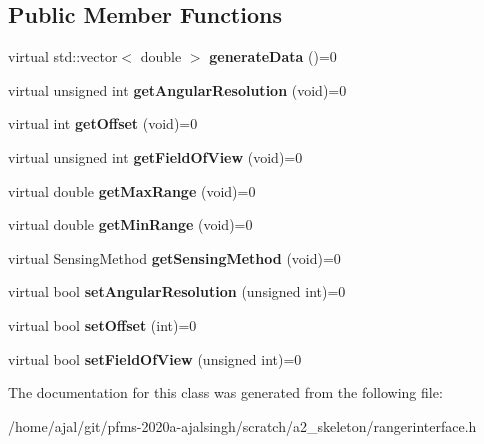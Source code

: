 \subsection*{Public Member Functions}
\begin{DoxyCompactItemize}
\item 
virtual std\+::vector$<$ double $>$ {\bfseries generate\+Data} ()=0\hypertarget{classRangerInterface_a969c670cadf55a15733809116dc305c8}{}\label{classRangerInterface_a969c670cadf55a15733809116dc305c8}

\item 
virtual unsigned int {\bfseries get\+Angular\+Resolution} (void)=0\hypertarget{classRangerInterface_a37d4f89daffa8b2708dfc11034893552}{}\label{classRangerInterface_a37d4f89daffa8b2708dfc11034893552}

\item 
virtual int {\bfseries get\+Offset} (void)=0\hypertarget{classRangerInterface_a8d77cf9d9b95fe8fb315931f2f278fec}{}\label{classRangerInterface_a8d77cf9d9b95fe8fb315931f2f278fec}

\item 
virtual unsigned int {\bfseries get\+Field\+Of\+View} (void)=0\hypertarget{classRangerInterface_a18716da6932402b8dda75f682be6f06c}{}\label{classRangerInterface_a18716da6932402b8dda75f682be6f06c}

\item 
virtual double {\bfseries get\+Max\+Range} (void)=0\hypertarget{classRangerInterface_a0bb29a41de5767c99081002c0590c186}{}\label{classRangerInterface_a0bb29a41de5767c99081002c0590c186}

\item 
virtual double {\bfseries get\+Min\+Range} (void)=0\hypertarget{classRangerInterface_ae6d501ddeeaad4a7b44d7d51ce64cb88}{}\label{classRangerInterface_ae6d501ddeeaad4a7b44d7d51ce64cb88}

\item 
virtual Sensing\+Method {\bfseries get\+Sensing\+Method} (void)=0\hypertarget{classRangerInterface_a6fdc6a8e9b3a4ebf0b1f5be3c607ef7d}{}\label{classRangerInterface_a6fdc6a8e9b3a4ebf0b1f5be3c607ef7d}

\item 
virtual bool {\bfseries set\+Angular\+Resolution} (unsigned int)=0\hypertarget{classRangerInterface_a313296ae5d13c6acce69caaf646ea66e}{}\label{classRangerInterface_a313296ae5d13c6acce69caaf646ea66e}

\item 
virtual bool {\bfseries set\+Offset} (int)=0\hypertarget{classRangerInterface_ae72584d83c94678d76f3fca20e432713}{}\label{classRangerInterface_ae72584d83c94678d76f3fca20e432713}

\item 
virtual bool {\bfseries set\+Field\+Of\+View} (unsigned int)=0\hypertarget{classRangerInterface_ad10f43a01e5285a654f09357028b1bb4}{}\label{classRangerInterface_ad10f43a01e5285a654f09357028b1bb4}

\end{DoxyCompactItemize}


The documentation for this class was generated from the following file\+:\begin{DoxyCompactItemize}
\item 
/home/ajal/git/pfms-\/2020a-\/ajalsingh/scratch/a2\+\_\+skeleton/rangerinterface.\+h\end{DoxyCompactItemize}
